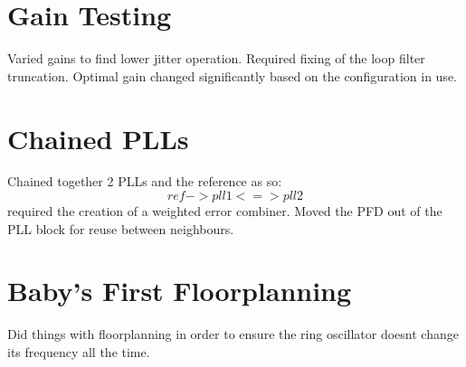 \documentclass[a4paper,12pt]{report}
\begin{document}
\section*{Gain Testing}
Varied gains to find lower jitter operation. Required fixing of the loop filter truncation. Optimal gain changed significantly based on the configuration in use.

\section*{Chained PLLs}
Chained together 2 PLLs and the reference as so:
\begin{equation*}
	ref -> pll1 <=> pll2
\end{equation*}
required the creation of a weighted error combiner. Moved the PFD out of the PLL block for reuse between neighbours.

\section*{Baby's First Floorplanning}
Did things with floorplanning in order to ensure the ring oscillator doesnt change its frequency all the time.
	
\end{document}
